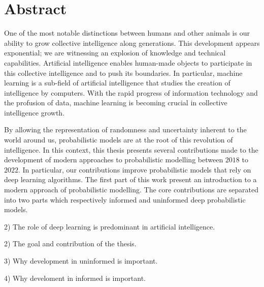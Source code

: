 
\chapter*{Abstract}
One of the most notable distinctions between humans and other animals is our ability to grow collective intelligence along generations. This development appears exponential; we are witnessing an explosion of knowledge and technical capabilities. Artificial intelligence enables human-made objects to participate in this collective intelligence and to push its boundaries. In particular, machine learning is a sub-field of artificial intelligence that studies the creation of intelligence by computers. With the rapid progress of information technology and the profusion of data, machine learning is becoming crucial in collective intelligence growth.

By allowing the representation of randomness and uncertainty inherent to the world around us, probabilistic models are at the root of this revolution of intelligence. In this context, this thesis presents several contributions made to the development of modern approaches to probabilistic modelling between $2018$ to $2022$. In particular, our contributions improve probabilistic models that rely on deep learning algorithms. The first part of this work present an introduction to a modern approach of probabilistic modelling. The core contributions are separated into two parts which respectively informed and uninformed deep probabilistic models.

2) The role of deep learning is predominant in artificial intelligence.

2) The goal and contribution of the thesis.

3) Why development in uninformed is important.

4) Why develoment in informed is important.


